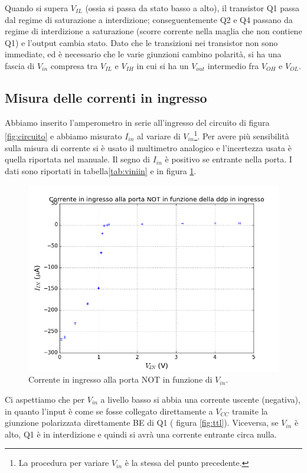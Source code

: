 \documentclass[10pt,a4paper]{article}
\begin{document}
Quando si supera $V_{IL}$ (ossia si passa da stato basso a alto), il transistor Q1 passa dal regime di saturazione a interdizione; conseguentemente Q2 e Q4 passano da regime di interdizione a saturazione (scorre corrente nella maglia che non contiene Q1) e l'output cambia stato. Dato che le transizioni nei transistor non sono immediate, ed è necessario che le varie giunzioni cambino polarità, si ha una fascia di $V_{in}$ compresa tra $V_{IL}$ e $V_{IH}$ in cui si ha un $V_{out}$ intermedio fra $V_{OH}$ e $V_{OL}$.
 
\subsection{Misura delle correnti in ingresso}
Abbiamo inserito l'amperometro in serie all'ingresso del circuito di figura \ref{fig:circuito} e abbiamo misurato $I_{in}$ al variare di $V_{in}$\footnote{La procedura per variare $V_{in}$ è la stessa del punto precedente.}. Per avere più sensibilità sulla misura di corrente si è usato il multimetro analogico e l'incertezza usata è quella riportata nel manuale. Il segno di $I_{in}$ è positivo se entrante nella porta.
I dati sono riportati in tabella\ref{tab:viniin} e in figura \ref{fig:viniin}.
\begin{figure}[!htb]
\centering
\includegraphics[scale=0.9]{viniin.png}
\caption{Corrente in ingresso alla porta NOT in funzione di $V_{in}$.\label{fig:viniin}}
\end{figure}
Ci aspettiamo che per $V_{in}$ a livello basso si abbia una corrente uscente (negativa), in quanto l'input è come se fosse collegato direttamente a $V_{CC}$ tramite la giunzione polarizzata direttamente BE di Q1 ( figura \ref{fig:ttl}). Viceversa, se $V_{in}$ è alto, Q1 è in interdizione e quindi si avrà una corrente entrante circa nulla.
\end{document}
